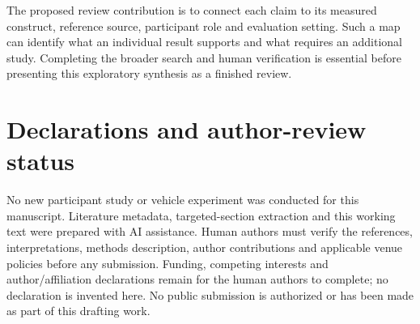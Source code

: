 \documentclass[11pt,a4paper]{article}
\begin{document}
The proposed review contribution is to connect each claim to its
measured construct, reference source, participant role and evaluation
setting. Such a map can identify what an individual result supports and
what requires an additional study. Completing the broader search and
human verification is essential before presenting this exploratory
synthesis as a finished review.

\section*{Declarations and author-review
status}\label{declarations-and-author-review-status}

No new participant study or vehicle experiment was conducted for this
manuscript. Literature metadata, targeted-section extraction and this
working text were prepared with AI assistance. Human authors must verify
the references, interpretations, methods description, author
contributions and applicable venue policies before any submission.
Funding, competing interests and author/affiliation declarations remain
for the human authors to complete; no declaration is invented here. No
public submission is authorized or has been made as part of this
drafting work.
\clearpage
{}
{}


\end{document}
